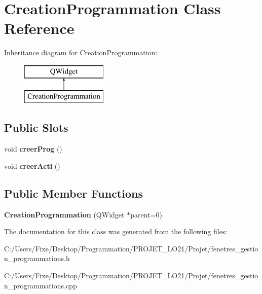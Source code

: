 \hypertarget{class_creation_programmation}{}\section{Creation\+Programmation Class Reference}
\label{class_creation_programmation}
Inheritance diagram for Creation\+Programmation\+:\begin{figure}[H]
\begin{center}
\leavevmode
\includegraphics[height=2.000000cm]{class_creation_programmation}
\end{center}
\end{figure}
\subsection*{Public Slots}
\begin{DoxyCompactItemize}
\item 
\hypertarget{class_creation_programmation_aad9283dd5a801ba6f6b2f58786cea855}{}void {\bfseries creer\+Prog} ()\label{class_creation_programmation_aad9283dd5a801ba6f6b2f58786cea855}

\item 
\hypertarget{class_creation_programmation_aed6c6b34cbadd60489827d2fc27c61a7}{}void {\bfseries creer\+Acti} ()\label{class_creation_programmation_aed6c6b34cbadd60489827d2fc27c61a7}

\end{DoxyCompactItemize}
\subsection*{Public Member Functions}
\begin{DoxyCompactItemize}
\item 
\hypertarget{class_creation_programmation_adb57bb2c32e5b044cf594e531fd1ffc6}{}{\bfseries Creation\+Programmation} (Q\+Widget $\ast$parent=0)\label{class_creation_programmation_adb57bb2c32e5b044cf594e531fd1ffc6}

\end{DoxyCompactItemize}


The documentation for this class was generated from the following files\+:\begin{DoxyCompactItemize}
\item 
C\+:/\+Users/\+Fixe/\+Desktop/\+Programmation/\+P\+R\+O\+J\+E\+T\+\_\+\+L\+O21/\+Projet/fenetres\+\_\+gestion\+\_\+programmations.\+h\item 
C\+:/\+Users/\+Fixe/\+Desktop/\+Programmation/\+P\+R\+O\+J\+E\+T\+\_\+\+L\+O21/\+Projet/fenetres\+\_\+gestion\+\_\+programmations.\+cpp\end{DoxyCompactItemize}
